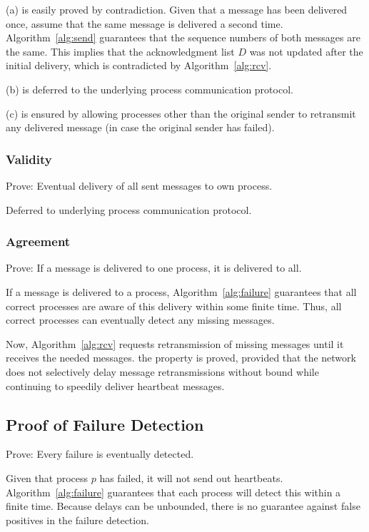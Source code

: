 \documentclass[]{article}
\begin{document}
(a) is easily proved by contradiction. Given that a message has been delivered once, assume that the same message is delivered a second time. Algorithm~\ref{alg:send} guarantees that the sequence numbers of both messages are the same. This implies that the acknowledgment list $D$ was not updated after the initial delivery, which is contradicted by Algorithm~\ref{alg:rcv}.

(b) is deferred to the underlying process communication protocol.

(c) is ensured by allowing processes other than the original sender to retransmit any delivered message (in case the original sender has failed).
\subsubsection{Validity}
Prove: Eventual delivery of all sent messages to own process.

Deferred to underlying process communication protocol.

\subsubsection{Agreement}
Prove: If a message is delivered to one process, it is delivered to all.

If a message is delivered to a process, Algorithm~\ref{alg:failure} guarantees that all correct processes are aware of this delivery within some finite time. Thus, all correct processes can eventually detect any missing messages.

Now, Algorithm~\ref{alg:rcv} requests retransmission of missing messages until it receives the needed messages.
the property is proved, provided that the network does not selectively delay message retransmissions without bound while continuing to speedily deliver heartbeat messages.

\subsection{Proof of Failure Detection}
Prove: Every failure is eventually detected.

Given that process $p$ has failed, it will not send out heartbeats. Algorithm~\ref{alg:failure} guarantees that each process will detect this within a finite time. Because delays can be unbounded, there is no guarantee against false positives in the failure detection.
\end{document}
